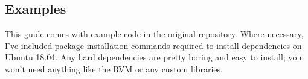 \documentclass{article}
\newcommand{\lnk}[2]{\href{#1}{\textcolor[rgb]{1.0,0.0,0.0}{#2}}}
\begin{document}
  \subsection*{Examples}
  This guide comes with
  \lnk{https://github.com/spencertipping/data-science-in-ten-minutes/tree/master/example}{example
  code} in the original repository. Where necessary, I've included package
  installation commands required to install dependencies on Ubuntu 18.04. Any
  hard dependencies are pretty boring and easy to install; you won't need
  anything like the RVM or any custom libraries.

  \newpage
  \newpage
  \newpage
\end{document}
